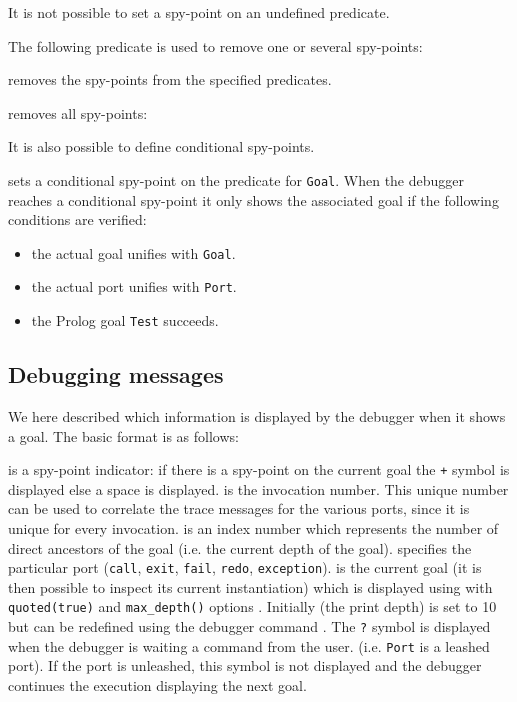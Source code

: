 It is not possible to set a spy-point on an undefined predicate. 

The following predicate is used to remove one or several spy-points:

 removes the spy-points from the specified
predicates.

 removes all spy-points:

It is also possible to define conditional spy-points. 

 sets a
conditional spy-point on the predicate for \texttt{Goal}. When the debugger
reaches a conditional spy-point it only shows the associated goal if the 
following conditions are verified:

\begin{itemize}

\item the actual goal unifies with \texttt{Goal}.

\item the actual port unifies with \texttt{Port}.

\item the Prolog goal \texttt{Test} succeeds.

\end{itemize}

\subsection{Debugging messages}
We here described which information is displayed by the debugger when it
shows a goal. The basic format is as follows: 


 is a spy-point indicator: if there is a spy-point on the
current goal the \texttt{+} symbol is displayed else a space is displayed.
 is the invocation number. This unique number can be used
to correlate the trace messages for the various ports, since it is unique
for every invocation.  is an index number which
represents the number of direct ancestors of the goal (i.e. the current
depth of the goal).  specifies the particular port
(\texttt{call}, \texttt{exit}, \texttt{fail}, \texttt{redo},
\texttt{exception}).  is the current goal (it is then
possible to inspect its current instantiation) which is displayed using
 with \texttt{quoted(true)} and
\texttt{max\_depth()} options . Initially
 (the print depth) is set to 10 but can be redefined
using the \texttt{{\lt}} debugger command . The
\texttt{?} symbol is displayed when the debugger is waiting a command from
the user. (i.e. \texttt{Port} is a leashed port). If the port is unleashed,
this symbol is not displayed and the debugger continues the execution
displaying the next goal.

